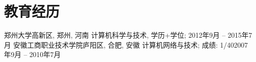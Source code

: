 \section{\textbf{教育经历}}
  \resumeSubHeadingListStart
    \resumeSubheading
      {郑州大学}{高新区, 郑州, 河南}
      {计算机科学与技术, 学历+学位; }{2012年9月 -- 2015年7月}
    \resumeSubheading
      {安徽工商职业技术学院}{庐阳区, 合肥, 安徽}
      {计算机网络与技术; 成绩: 1/40}{2007年9月 -- 2010年7月}
  \resumeSubHeadingListEnd